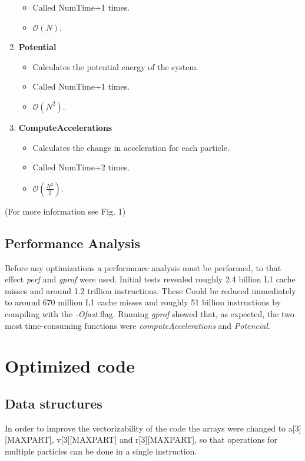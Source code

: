 \documentclass[conference]{IEEEtran}
\begin{document}
\begin{enumerate}
\begin{itemize}
        \item Called NumTime+1 times.
        \item $\mathcal{O}(N)$.
    \end{itemize}
    \item \textbf{Potential}
    \begin{itemize}
        \item Calculates the potential energy of the system.
        \item Called NumTime+1 times.
        \item $\mathcal{O}(N^2)$.
    \end{itemize}
    \item \textbf{ComputeAccelerations}
    \begin{itemize}
        \item Calculates the change in acceleration for each particle.
        \item Called NumTime+2 times.
        \item $\mathcal{O}(\frac{N^2}{2})$.
    \end{itemize}
\end{enumerate}

(For more information see Fig. 1)

\subsection{Performance Analysis}\label{AA}

Before any optimizations a performance analysis must be performed, to that effect \textit{perf} and \textit{gprof} were used. Initial tests revealed roughly 2.4 billion L1 cache misses and around 1.2 trillion instructions. These Could be reduced immediately to around 670 million L1 cache misses and roughly 51 billion instructions by compiling with the \textit{-Ofast} flag.
Running \textit{gprof} showed that, as expected, the two most time-consuming functions were \textit{computeAccelerations} and \textit{Potencial}.

\section{Optimized code}

\subsection{Data structures}
In order to improve the vectorizability of the code the arrays were changed to a[3][MAXPART], v[3][MAXPART] and r[3][MAXPART], so that operations for multiple particles can be done in a single instruction.
\end{document}
